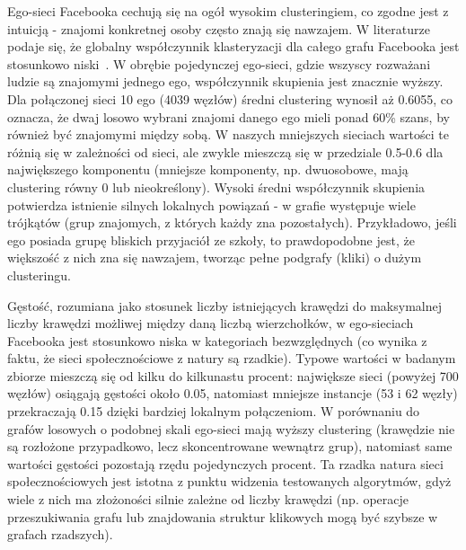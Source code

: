 Ego-sieci Facebooka cechują się na ogół wysokim clusteringiem, co zgodne jest z intuicją - znajomi konkretnej osoby często znają się nawzajem. W literaturze podaje się, że globalny współczynnik klasteryzacji dla całego grafu Facebooka jest stosunkowo niski~\cite{Ugander2011}. W obrębie pojedynczej ego-sieci, gdzie wszyscy rozważani ludzie są znajomymi jednego ego, współczynnik skupienia jest znacznie wyższy. Dla połączonej sieci 10 ego (4039 węzłów) średni clustering wynosił aż 0.6055, co oznacza, że dwaj losowo wybrani znajomi danego ego mieli ponad 60\% szans, by również być znajomymi między sobą. W naszych mniejszych sieciach wartości te różnią się w zależności od sieci, ale zwykle mieszczą się w przedziale 0.5-0.6 dla największego komponentu (mniejsze komponenty, np. dwuosobowe, mają clustering równy 0 lub nieokreślony). Wysoki średni współczynnik skupienia potwierdza istnienie silnych lokalnych powiązań - w grafie występuje wiele trójkątów (grup znajomych, z których każdy zna pozostałych). Przykładowo, jeśli ego posiada grupę bliskich przyjaciół ze szkoły, to prawdopodobne jest, że większość z nich zna się nawzajem, tworząc pełne podgrafy (kliki) o dużym clusteringu.

Gęstość, rozumiana jako stosunek liczby istniejących krawędzi do maksymalnej liczby krawędzi możliwej między daną liczbą wierzchołków, w ego-sieciach Facebooka jest stosunkowo niska w kategoriach bezwzględnych (co wynika z faktu, że sieci społecznościowe z natury są rzadkie). Typowe wartości w badanym zbiorze mieszczą się od kilku do kilkunastu procent: największe sieci (powyżej 700 węzłów) osiągają gęstości około 0.05, natomiast mniejsze instancje (53 i 62 węzły) przekraczają 0.15 dzięki bardziej lokalnym połączeniom. W porównaniu do grafów losowych o podobnej skali ego-sieci mają wyższy clustering (krawędzie nie są rozłożone przypadkowo, lecz skoncentrowane wewnątrz grup), natomiast same wartości gęstości pozostają rzędu pojedynczych procent. Ta rzadka natura sieci społecznościowych jest istotna z punktu widzenia testowanych algorytmów, gdyż wiele z nich ma złożoności silnie zależne od liczby krawędzi (np. operacje przeszukiwania grafu lub znajdowania struktur klikowych mogą być szybsze w grafach rzadszych).

